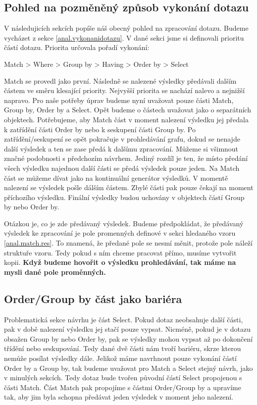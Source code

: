 \subsection{Pohled na pozměněný způsob vykonání dotazu}

V následujicích sekcích popíše náš obecný pohled na zpracování dotazu.
Budeme vycházet z sekce \ref{anal.vykonanidotazu}.
V dané sekci jsme si definovali prioritu částí dotazu.
Priorita určovala pořadí vykonání:
\begin{code}
Match > Where > Group by > Having > Order by > Select
\end{code}
Match se provedl jako první.
Následně se nalezené výsledky předávali dalším částem ve směru klesající priority.
Nejvyšší priorita se nachází nalevo a nejnižší napravo.
Pro naše potřeby úprav budeme nyní uvažovat pouze části Match, Group by, Order by a Select.
Opět budeme o částech uvažovat jako o separátních objektech.
Potřebujeme, aby Match část v moment nalezení výsledku jej předala k zatřídění části Order by nebo k seskupení části Group by.
Po zatřídění/seskupení se opět pokračuje v prohledávání grafu, dokud se nenajde další výsledek a ten se zase předá k dalšímu zpracování.
Můžeme si všimnout značné podobnosti s předchozím návrhem. 
Jediný rozdíl je ten, že místo předání všech výsledku najednou další části se předá výsledek pouze jeden.
Na Match část se můžeme dívat jako na kontinuální generátor výsledků. 
V momentě nalezení se výsledek pošle dálším částem.
Zbylé části pak pouze čekají na moment příchozího výsledku.
Finální výsledky budou uchovány v objektech částí Group by nebo Order by. 

Otázkou je, co je zde předávaný výsledek.
Budeme předpokládat, že předávaný výsledek ke zpracování je pole promenných definové v sekci hledaného vzoru \ref{anal.match.res}.
To znamená, že předané pole se nesmí měnit, protože pole náleží struktuře vzoru.
Tedy pokud s ním chceme pracovat přímo, musíme vytvořit kopii.
\textbf{Když budeme hovořit o výsledku prohledávání, tak máme na mysli dané pole proměnných.}

\subsection{Order/Group by část jako bariéra}

Problematická sekce návrhu je část Select.
Pokud dotaz neobsahuje další části, pak v době nalezení výsledku jej stačí pouze vypsat.
Nicméně, pokud je v dotazu obsažen Group by nebo Order by, pak se výsledky mohou vypsat až po dokončení třídění nebo seskupování.
Tedy dané dvě části nám tvoří bariéru, skrze kterou nemůže posílat výsledky dále.
Jelikož máme navrhnout pouze vykonání částí Order by a Group by, tak budeme uvažovat pro Match a Select stejný návrh, jako v minulých sekcích.
Tedy dotaz bude tvořen původní částí Select propojenou s části Match.
Část Match pak propojíme s částmi Order/Group by a upravíme tak, aby jim byla schopna předávat jeden výsledek v moment jeho nalezení.  

